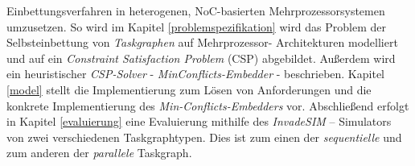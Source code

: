 Einbettungsverfahren in heterogenen, NoC-basierten Mehrprozessorsystemen
umzusetzen. So wird im Kapitel \ref{problemspezifikation} wird das Problem der Selbsteinbettung von \textit{Taskgraphen} auf Mehrprozessor-
Architekturen modelliert und auf ein \textit{Constraint Satisfaction Problem} (CSP) abgebildet. Außerdem wird ein heuristischer \textit{CSP-Solver} - \textit{MinConflicts-Embedder} - beschrieben. Kapitel \ref{model} stellt die Implementierung zum Lösen von Anforderungen und die konkrete Implementierung des \textit{Min-Conflicts-Embedders} vor. Abschließend erfolgt in Kapitel \ref{evaluierung} eine Evaluierung mithilfe des \textit{InvadeSIM} -- Simulators \cite{cf:MPSoCs} von zwei verschiedenen Taskgraphtypen. Dies ist zum einen der \textit{sequentielle} und zum anderen der \textit{parallele} Taskgraph.